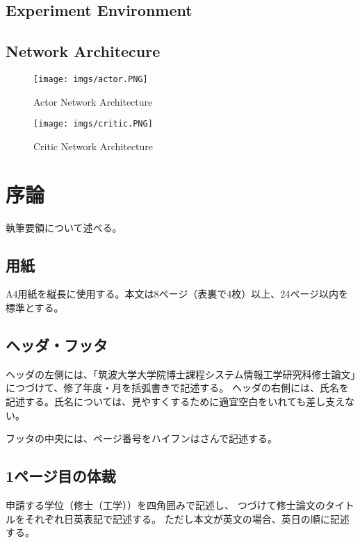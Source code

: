 \documentclass[11pt,twocolumn]{jarticle} %
\begin{document}
\subsection{Experiment Environment}



\subsection{Network Architecure}
\begin{figure}[h]
 \begin{center}
  \texttt{[image: imgs/actor.PNG]}
  \caption{Actor Network Architecture}\label{fig:Actor}
 \end{center}
\end{figure}



\begin{figure}[h]
 \begin{center}
  \texttt{[image: imgs/critic.PNG]}
  \caption{Critic Network Architecture}\label{fig:Critic}
 \end{center}
\end{figure}


\section{序論}
執筆要領について述べる。

\subsection{用紙}
A4用紙を縦長に使用する。本文は8ページ（表裏で4枚）以上、24ページ以内を標準とする。

\subsection{ヘッダ・フッタ}
ヘッダの左側には、「筑波大学大学院博士課程システム情報工学研究科修士論文」につづけて、修了年度・月を括弧書きで記述する。
ヘッダの右側には、氏名を記述する。氏名については、見やすくするために適宜空白をいれても差し支えない。

フッタの中央には、ページ番号をハイフンはさんで記述する。

\subsection{1ページ目の体裁}
申請する学位（修士（工学））を四角囲みで記述し、
つづけて修士論文のタイトルをそれぞれ日英表記で記述する。
ただし本文が英文の場合、英日の順に記述する。
\end{document}
